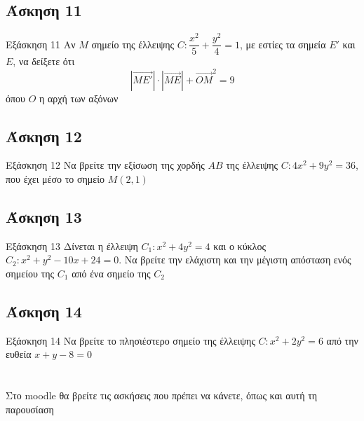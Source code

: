 \documentclass[greek]{beamer}
\begin{document}
\subsection{Άσκηση 11}
\begin{frame}[label=Άσκηση11,t]{Εξάσκηση 11}
  Αν $Μ$ σημείο της έλλειψης $C:\dfrac{x^2}{5}+\dfrac{y^2}{4}=1$, με εστίες τα σημεία $Ε'$ και $Ε$, να δείξετε ότι
  $$|\overrightarrow{ΜΕ'}|\cdot |\overrightarrow{ΜΕ}|+\overrightarrow{ΟΜ}^2=9$$
  όπου $Ο$ η αρχή των αξόνων

\end{frame}

\subsection{Άσκηση 12}
\begin{frame}[label=Άσκηση12,t]{Εξάσκηση 12}
  Να βρείτε την εξίσωση της χορδής $ΑΒ$ της έλλειψης $C:4x^2+9y^2=36$, που έχει μέσο το σημείο $Μ(2,1)$

\end{frame}

\subsection{Άσκηση 13}
\begin{frame}[label=Άσκηση13,t]{Εξάσκηση 13}
  Δίνεται η έλλειψη $C_1:x^2+4y^2=4$ και ο κύκλος $C_2:x^2+y^2-10x+24=0$. Να βρείτε την ελάχιστη και την μέγιστη απόσταση ενός σημείου της $C_1$ από ένα σημείο της $C_2$

\end{frame}

\subsection{Άσκηση 14}
\begin{frame}[label=Άσκηση14,t]{Εξάσκηση 14}
  Να βρείτε το πλησιέστερο σημείο της έλλειψης $C:x^2+2y^2=6$ από την ευθεία $x+y-8=0$

\end{frame}

\appendix

\section{}
\begin{frame}
 Στο moodle θα βρείτε τις ασκήσεις που πρέπει να κάνετε, όπως και αυτή τη παρουσίαση
\end{frame}
\end{document}

